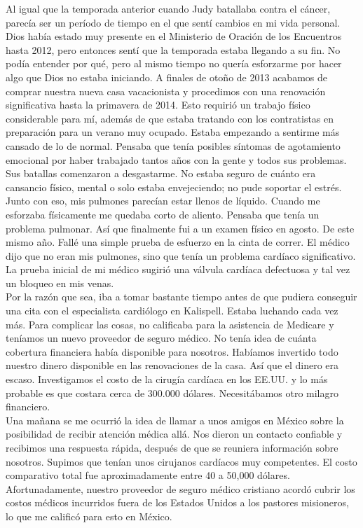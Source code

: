 \documentclass[twoside, 12pt]{book}
\begin{document}
Al igual que la temporada anterior cuando Judy batallaba contra el cáncer, parecía ser un período de tiempo en el que sentí cambios en mi vida personal. Dios había estado muy presente en el Ministerio de Oración de los Encuentros hasta 2012, pero entonces sentí que la temporada estaba llegando a su fin. No podía entender por qué, pero al mismo tiempo no quería esforzarme por hacer algo que Dios no estaba iniciando. A finales de otoño de 2013 acabamos de comprar nuestra nueva casa vacacionista y procedimos con una renovación significativa hasta la primavera de 2014. Esto requirió un trabajo físico considerable para mí, además de que estaba tratando con los contratistas en preparación para un verano muy ocupado. Estaba empezando a sentirme más cansado de lo de normal. Pensaba que tenía posibles síntomas de agotamiento emocional por haber trabajado tantos años con la gente y todos sus problemas. Sus batallas comenzaron a desgastarme. No estaba seguro de cuánto era cansancio físico, mental o solo estaba envejeciendo; no pude soportar el estrés.  Junto con eso, mis pulmones parecían estar llenos de líquido. Cuando me esforzaba físicamente me quedaba corto de aliento.  Pensaba que tenía un problema pulmonar. Así que finalmente fui a un examen físico en agosto. De este mismo año. Fallé una simple prueba de esfuerzo en la cinta de correr. El médico dijo que no eran mis pulmones, sino que tenía un problema cardíaco significativo. La prueba inicial de mi médico sugirió una válvula cardíaca defectuosa y tal vez un bloqueo en mis venas.\\

Por la razón que sea, iba a tomar bastante tiempo antes de que pudiera conseguir una cita con el especialista cardiólogo en Kalispell. Estaba luchando cada vez más.  Para complicar las cosas, no calificaba para la asistencia de Medicare y teníamos un nuevo proveedor de seguro médico. No tenía idea de cuánta cobertura financiera había disponible para nosotros. Habíamos invertido todo nuestro dinero disponible en las renovaciones de la casa.  Así que el dinero era escaso.  Investigamos el costo de la cirugía cardíaca en los EE.UU. y lo más probable es que costara cerca de 300.000 dólares.  Necesitábamos otro milagro financiero.\\

Una mañana se me ocurrió la idea de llamar a unos amigos en México sobre la posibilidad de recibir atención médica allá. Nos dieron un contacto confiable y recibimos una respuesta rápida, después de que se reuniera información sobre nosotros. Supimos que tenían unos cirujanos cardíacos muy competentes. El costo comparativo total fue aproximadamente entre 40 a 50,000 dólares. Afortunadamente, nuestro proveedor de seguro médico cristiano acordó cubrir los costos médicos incurridos fuera de los Estados Unidos a los pastores misioneros, lo que me calificó para esto en México.\\
\end{document}

